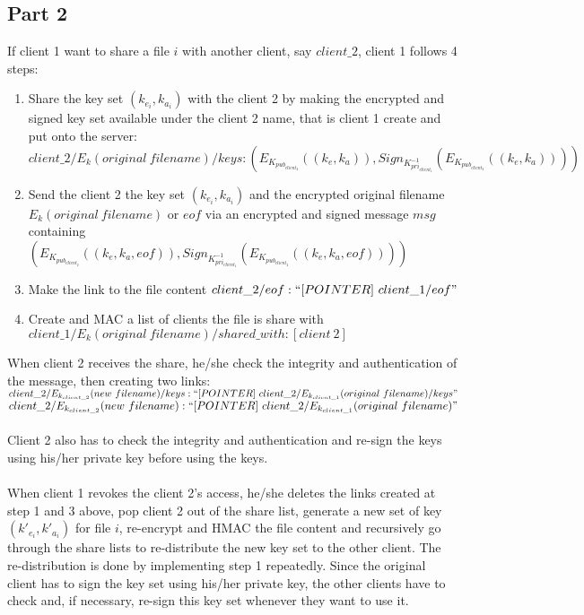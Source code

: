 \documentclass[a4paper, 11pt]{article}
\begin{document}
\subsection*{Part 2}
If client 1 want to share a file $i$ with another client, say $client\_2$, client 1 follows 4 steps:
%
\begin{enumerate}
	\item Share the key set $(k_{e_i},k_{a_i})$ with the client 2 by making the encrypted and signed key set available under the client 2 name, that is client 1 create and put onto the server:\\
	$client\_2/E_k(original\ filename)/keys : \left(E_{K_{pub_{client_2}}}((k_e, k_a)), Sign_{K^{-1}_{pri_{client_1}}}(E_{K_{pub_{client_2}}}((k_e, k_a)))\right)$
	\item Send the client 2 the key set $(k_{e_i},k_{a_i})$ and the encrypted original filename 	$E_k(original\ filename)$ or $eof$ via an encrypted and signed message $msg$ containing\\ $\left(E_{K_{pub_{client_2}}}((k_e, k_a, eof)), Sign_{K^{-1}_{pri_{client_1}}}(E_{K_{pub_{client_2}}}((k_e, k_a, eof)))\right)$
	\item Make the link to the file content $client\_2/eof : ``[POINTER]\ client\_1/eof"$
	\item Create and MAC a list of clients the file is share with\\
	$client\_1/E_k(original\ filename)/shared\_with : [client\ 2]$
\end{enumerate}
%
When client 2 receives the share, he/she check the integrity and authentication of the message, then creating two links:\\
$client\_2/E_{k_{client\_2}}(new\ filename)/keys : ``[POINTER]\ client\_2/E_{k_{client\_1}}(original\ filename)/keys"$\\
$client\_2/E_{k_{client\_2}}(new\ filename) : ``[POINTER]\ client\_2/E_{k_{client\_1}}(original\ filename)"$\\
\\
Client 2 also has to check the integrity and authentication and re-sign the keys using his/her private key before using the keys.\\
\\
When client 1 revokes the client 2's access, he/she deletes the links created at step 1 and 3 above, pop client 2 out of the share list, generate a new set of key $(k'_{e_i},k'_{a_i})$ for file $i$, re-encrypt and HMAC the file content and recursively go through the share lists to re-distribute the new key set to the other client. The re-distribution is done by implementing step 1 repeatedly. Since the original client has to sign the key set using his/her private key, the other clients have to check and, if necessary, re-sign this key set whenever they want to use it.\\
\end{document}
